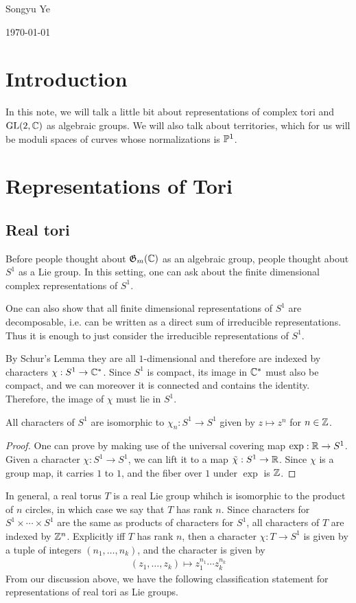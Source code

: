 \documentclass[12pt]{article}
\begin{document}
Songyu Ye

\today
\section{Introduction}
In this note, we will talk a little bit about representations of complex tori 
and $\GL(2,\C)$ as algebraic groups. We will also talk about territories, which
for us will be moduli spaces of curves whose normalizations is $\P^1$.

\section{Representations of Tori}
\subsection{Real tori}
Before people thought about $\Gm(\C)$ as an algebraic group, people thought about $S^1$ as a Lie group.
In this setting, one can ask about the finite dimensional complex representations of $S^1$.

\hfill 

One can also show that all finite dimensional representations of $S^1$ are decomposable, i.e.
can be written as a direct sum of irreducible representations. Thus it is enough to just consider the irreducible representations of $S^1$.

\hfill 

By Schur's Lemma they are all $1$-dimensional and therefore are indexed by characters $\chi: S^1\to \C^*$.
Since $S^1$ is compact, its image in $\C^*$ must also be compact, and we can moreover
it is connected and contains the identity. Therefore, the image of $\chi$ must lie in $S^1$.


\begin{proposition}
All characters of $S^1$ are isomorphic to $\chi_n: S^1\to S^1$ given by $z\mapsto z^n$ for $n\in \Z$.
\end{proposition}

\begin{proof}
    One can prove by making use of the universal covering map $\exp: \R\to S^1$.
    Given a character $\chi: S^1\to S^1$, we can lift it to a map $\tilde \chi: S^1\to \R$.
    Since $\chi$ is a group map, it carries $1$ to $1$, and the fiber over $1$ under $\exp$ is $\Z$.
\end{proof}

In general, a real torus $T$ is a real Lie group whihch is isomorphic to the product of $n$ circles, 
in which case we say that $T$ has rank $n$. Since characters for $S^1\times\cdots\times S^1$ are the same as products of characters for $S^1$, 
all characters of $T$ are indexed by $\Z^n$. Explicitly iff $T$ has rank $n$, then a character $\chi: T\to S^1$ is given by a tuple of integers $(n_1,\ldots, n_k)$, and the character is given by
\begin{align*}
    (z_1,\ldots, z_k)\mapsto z_1^{n_1}\cdots z_k^{n_k}
\end{align*}
From our discussion above, we have the following classification statement for representations of real tori as Lie groups.
\end{document}
